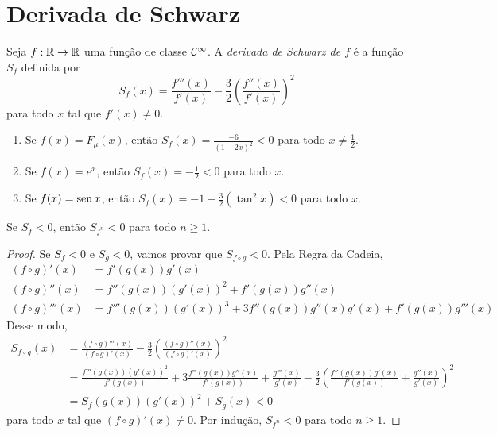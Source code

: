 \section{Derivada de Schwarz}

\begin{definition}
Seja $f: \mathbb{R} \to \mathbb{R}$ uma função de classe $\mathcal{C}^\infty$.  A \textit{derivada de Schwarz de $f$} é a função $S_f$ definida por
$$S_f(x) = \frac{f'''(x)}{f'(x)} - \frac{3}{2} \left( \frac{f''(x)}{f'(x)} \right)^2$$
para todo $x$ tal que $f'(x) \neq 0$.

\end{definition}

\begin{example}

\begin{enumerate}

\item Se $f(x) = F_{\mu}(x)$, então $S_f(x)  = \frac{-6}{(1-2x)^2} < 0$ para todo $x \neq \frac{1}{2}$.
\item Se $f(x) = e^x$, então $S_f(x) = -\frac{1}{2} < 0$ para todo $x$.
\item Se $f(x) = \operatorname{sen} x$, então $S_f(x) = -1 -\frac{3}{2}(\tan^2 x) < 0$ para todo $x$.
\end{enumerate}
\end{example}

\begin{lemma}
Se $S_f < 0$, então $S_{f^n} < 0$ para todo $n \geq 1$.
\end{lemma}

\begin{proof}
Se $S_f < 0$ e $S_g < 0$, vamos provar que $S_{f \circ g} < 0$. Pela Regra da Cadeia,
\begin{align*}
(f \circ g)'(x) & = f'(g(x))g'(x) \\
(f \circ g)''(x) & = f''(g(x))(g'(x))^2 + f'(g(x))g''(x) \\
(f \circ g)'''(x) & = f'''(g(x))(g'(x))^3 + 3f''(g(x))g''(x)g'(x) + f'(g(x))g'''(x)
\end{align*}
Desse modo,
\begin{align*}
S_{f \circ g}(x) & = \frac{(f \circ g)'''(x)}{(f \circ g)'(x)} - \frac{3}{2} \left( \frac{(f \circ g)''(x)}{(f \circ g)'(x)} \right)^2 \\
& = \frac{f'''(g(x))(g'(x))^2}{f'(g(x))} + 3\frac{f''(g(x))g''(x)}{f'(g(x))} + \frac{g'''(x)}{g'(x)} - \frac{3}{2}\left( \frac{f''(g(x))g'(x)}{f'(g(x))} + \frac{g''(x)}{g'(x)} \right)^2 \\
& = S_f(g(x)) (g'(x))^2 + S_g(x) < 0
\end{align*}
para todo $x$ tal que $(f \circ g)'(x) \neq 0$. Por indução, $S_{f^n} < 0$ para todo $n \geq 1$.
\end{proof}

